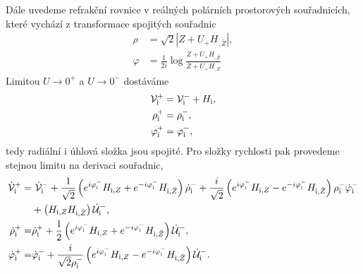 Dále uvedeme refrakční rovnice v reálných polárních prostorových souřadnicích, které vychází z transformace spojitých souřadnic
\begin{equation}
    \begin{split}
        \rho &= \sqrt{2} \left|Z + U_{+} H_{,\bar{Z}}\right|, \\
        \varphi &= \frac{1}{2i} \log \frac{Z + U_+ H_{,\bar{Z}}}{\bar{Z} + U_+ H_{,Z}}
    \end{split}
\end{equation}
Limitou $U \to 0^+$ a $U \to 0^-$ dostáváme
\begin{equation}
    \begin{split}
        \mathcal{V}^{+}_{\mathrm{i}} &= \mathcal{V}^{-}_{\mathrm{i}} + H_{\mathrm{i}},\\
        \rho^{+}_{\mathrm{i}} &= \rho^{-}_{\mathrm{i}},\\
        \varphi^{+}_{\mathrm{i}} &= \varphi^{-}_{\mathrm{i}},
    \end{split}
\end{equation}
tedy radiální i úhlová složka jsou spojité. Pro složky rychlosti pak provedeme stejnou limitu na derivaci souřadnic,
\begin{equation}
    \begin{split}
        \dot{\mathcal{V}}_{\mathrm{i}}^{+}=& ~\dot{\mathcal{V}}_{\mathrm{i}}^{-}+\frac{1}{\sqrt{2}}\left(e^{i \varphi_{\mathrm{i}}^{-}} H_{\mathrm{i}, Z}+e^{-i \varphi_{\mathrm{i}}^{-}} H_{\mathrm{i}, \bar{Z}}\right) \dot{\rho}_{\mathrm{i}}^{-}+\frac{i}{\sqrt{2}}\left(e^{i \varphi_{\mathrm{i}}^{-}} H_{\mathrm{i}, Z}-e^{-i \varphi_{\mathrm{i}}^{-}} H_{\mathrm{i}, \bar{Z}}\right) \rho_{\mathrm{i}}^{-} \dot{\varphi}_{\mathrm{i}}^{-} \\
        &+\left(H_{\mathrm{i}, Z} H_{\mathrm{i}, \bar{Z}}\right) \dot{\mathcal{U}}_{\mathrm{i}}^{-}, \\
        \dot{\rho}_{\mathrm{i}}^{+}=& \dot{\rho}_{\mathrm{i}}^{+} + \frac{1}{2} \left(e^{i \varphi^-_\mathrm{i}} H_{\mathrm{i},Z} + e^{-i \varphi^-_\mathrm{i}} H_{\mathrm{i},\bar{Z}}\right)\dot{\mathcal{U}}_\mathrm{i}^{-},\\
        \dot{\varphi}_{\mathrm{i}}^{+}=&\dot{\varphi}_{\mathrm{i}}^{-} + \frac{i}{\sqrt{2}\rho_{\mathrm{i}}^{-}} \left(e^{i \varphi_{\mathrm{i}}^{-}} H_{\mathrm{i}, Z} - e^{-i \varphi_{\mathrm{i}}^{-}} H_{\mathrm{i}, \bar{Z}}\right) \dot{\mathcal{U}}_{\mathrm{i}}^{-}.
        \end{split}
\end{equation}

